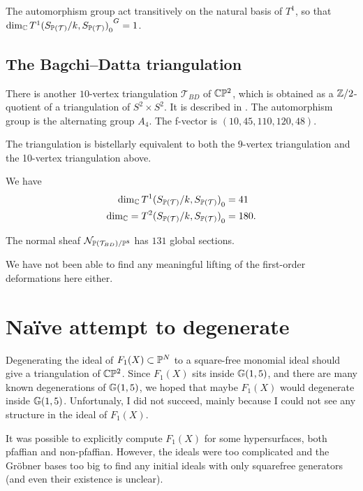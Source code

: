 The automorphism group act transitively on the natural basis of $T^1$, so that $\dim_\C {{T^1(S_{\P(\mathcal T)}/k, S_{\P(\mathcal T)})}_0}^G=1$. 

\subsection{The Bagchi--Datta triangulation}

There is another $10$-vertex triangulation $\mathcal T_{BD}$ of $\C \P^2$, which is obtained as a $\Z/2$-quotient of a triangulation of $S^2 \times S^2$. It is described in \cite{bagchi_datta}. The automorphism group is the alternating group $A_4$. The f-vector is $(10,45,110,120,48)$.

The triangulation is bistellarly equivalent to both the 9-vertex triangulation and the 10-vertex triangulation above.

\begin{proposition}
We have
\begin{eqnarray*}
\dim_\C  {T^1(S_{\P(\mathcal T)}/k, S_{\P(\mathcal T)})}_0 &= 41 \\
\dim_\C = {T^2(S_{\P(\mathcal T)}/k, S_{\P(\mathcal T)})}_0 &=180.
\end{eqnarray*}

The normal sheaf $\mathcal N_{\P(\mathcal T_{BD})/\P^{8}}$ has $131$ global sections.
\end{proposition}

We have not been able to find any meaningful lifting of the first-order deformations here either.

\section{Naïve attempt to degenerate}

Degenerating the ideal of $F_1(X) \subset \P^N$ to a square-free monomial ideal should give a triangulation of $\C \P^2$. Since $F_1(X)$ sits inside $\Gr(1,5)$, and there are many known degenerations of $\Gr(1,5)$, we hoped that maybe $F_1(X)$ would degenerate inside $\Gr(1,5)$. Unfortunaly, I did not succeed, mainly because I could not see any structure in the ideal of $F_1(X)$.

It was possible to explicitly compute $F_1(X)$ for some hypersurfaces, both pfaffian and non-pfaffian. However, the ideals were too complicated and the Gröbner bases too big to find any initial ideals with only squarefree generators (and even their existence is unclear).


